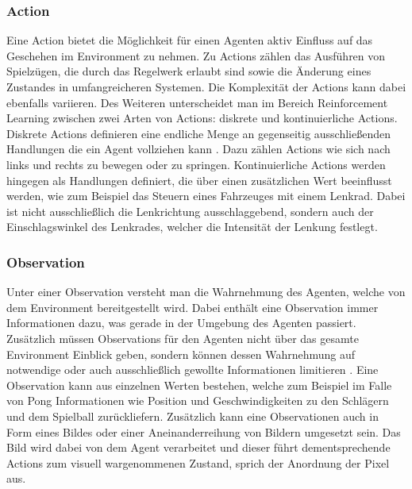 \documentclass[11pt]{scrartcl}
\begin{document}
\subsubsection{Action}
\label{sec:action}
Eine Action bietet die Möglichkeit für einen Agenten aktiv Einfluss auf das Geschehen im
Environment zu nehmen. Zu Actions zählen das Ausführen von Spielzügen, die durch das
Regelwerk erlaubt sind sowie die Änderung eines Zustandes in umfangreicheren Systemen. Die
Komplexität der Actions kann dabei ebenfalls variieren. Des Weiteren unterscheidet man im Bereich
Reinforcement Learning zwischen zwei Arten von Actions: diskrete und kontinuierliche Actions.
Diskrete Actions definieren eine endliche Menge an gegenseitig ausschließenden Handlungen die ein  %
Agent vollziehen kann \cite[~S.8]{L2018}. Dazu zählen Actions wie sich nach links und rechts zu
bewegen oder zu springen. Kontinuierliche Actions werden hingegen als Handlungen definiert, die
über einen zusätzlichen Wert beeinflusst werden, wie zum Beispiel das Steuern eines Fahrzeuges
mit einem Lenkrad. Dabei ist nicht ausschließlich die Lenkrichtung ausschlaggebend, sondern auch
der Einschlagswinkel des Lenkrades, welcher die Intensität der Lenkung festlegt.


\subsubsection{Observation}
Unter einer Observation versteht man die Wahrnehmung des Agenten, welche von dem Environment 
bereitgestellt wird. Dabei enthält eine Observation immer Informationen dazu, was gerade in der
Umgebung des Agenten passiert. Zusätzlich müssen Observations für den Agenten nicht über das
gesamte Environment Einblick geben, sondern können dessen Wahrnehmung auf notwendige oder auch
ausschließlich gewollte Informationen limitieren \cite[~S.8 f.]{L2018}. Eine Observation kann 
aus einzelnen Werten bestehen, welche zum Beispiel im Falle von Pong Informationen wie Position
und Geschwindigkeiten zu den Schlägern und dem Spielball zurückliefern. Zusätzlich kann eine
Observationen auch in Form eines Bildes oder einer Aneinanderreihung von Bildern umgesetzt sein.
Das Bild wird dabei von dem Agent verarbeitet und dieser führt dementsprechende Actions zum
visuell wargenommenen Zustand, sprich der Anordnung der Pixel aus. 
\end{document}
